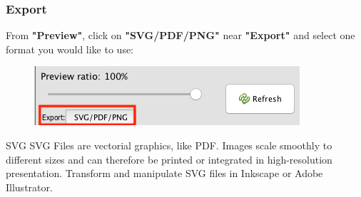 \documentclass[10pt]{beamer}
\begin{document}
\begin{frame}
\frametitle{Export}
From \textbf{"Preview"}, click on \textbf{"SVG/PDF/PNG"} near \textbf{"Export"} and select one format you would like to use:
\begin{figure}
	\includegraphics[width=0.4\linewidth]{figures/export.png}
\end{figure}
\begin{block}{SVG}
SVG Files are vectorial graphics, like PDF. Images scale smoothly to different sizes and
can therefore be printed or integrated in high-resolution presentation. Transform and manipulate SVG files in Inkscape or Adobe Illustrator.
\end{block}
\end{frame}
\end{document}
